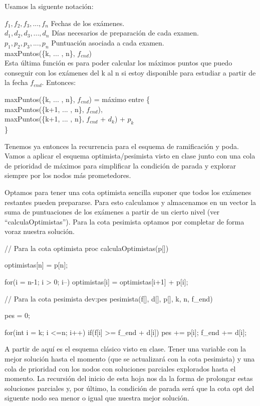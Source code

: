 \documentclass[12pt]{article}
\begin{document}
Usamos la siguente notación: \\ \setlength{\parskip}{0mm}

$f_1, f_2, f_3, ... , f_n$ \hspace{1cm} Fechas de los exámenes. \\
$d_1, d_2, d_3, ... , d_n$ \hspace{1cm} Días necesarios de preparación de cada examen. \\
$p_1, p_2, p_3, ... , p_n$ \hspace{1cm} Puntuación asociada a cada examen. \\
    
maxPuntos(\{k, ... , n\}, $f_{end}$) \\ 

Esta última función es para poder calcular los máximos puntos que puedo conseguir con los 
exámenes del k al n si estoy disponible para estudiar a partir de la fecha $f_{end}$. 
Entonces:

\setlength{\parskip}{\baselineskip}

maxPuntos(\{k, ... , n\}, $f_{end}$) = máximo entre \{ \\
\setlength{\parindent}{10mm} 
\indent maxPuntos(\{k+1, ... , n\}, $f_{end}$), \\
\indent maxPuntos(\{k+1, ... , n\}, $f_{end}$ + $d_k$) + $p_k$ \\ \} \\
\setlength{\parindent}{0mm} 

Tenemos ya entonces la recurrencia para el esquema de ramificación y poda. Vamos a aplicar el
esquema optimista/pesimista visto en clase junto con una cola de prioridad de máximos para 
simplificar la condición de parada y explorar siempre por los nodos más prometedores.

Optamos para tener una cota optimista sencilla suponer que todos los exámenes restantes pueden
prepararse. Para esto calculamos y almacenamos en un vector la suma de puntuaciones de los 
exámenes a partir de un cierto nivel (ver ``calculaOptimistas''). Para la cota pesimista optamos
por completar de forma voraz nuestra solución. 

\begin{listing}
// Para la cota optimista
proc calculaOptimistas(p[])
{
    optimistas[n] = p[n];
    
    for(i = n-1; i > 0; i--)
        optimistas[i] = optimistas[i+1] + p[i];
}


// Para la cota pesimista
dev:pes pesimista(f[], d[], p[], k, n, f_end)
{
    pes = 0;
    
    for(int i = k; i <=n; i++)
    {
        if(f[i] >= f_end + d[i])
        {
            pes   += p[i];
            f_end += d[i];
        }
    }
}
\end{listing}

A partir de aquí es el esquema clásico visto en clase. Tener una variable con la mejor solución
hasta el momento (que se actualizará con la cota pesimista) y una cola de prioridad con los
nodos con soluciones parciales explorados hasta el momento. La recursión del inicio de esta hoja
nos da la forma de prolongar estas soluciones parciales y, por último, la condición de parada 
será que la cota opt del siguente nodo sea menor o igual que nuestra mejor solución. 
\end{document}
